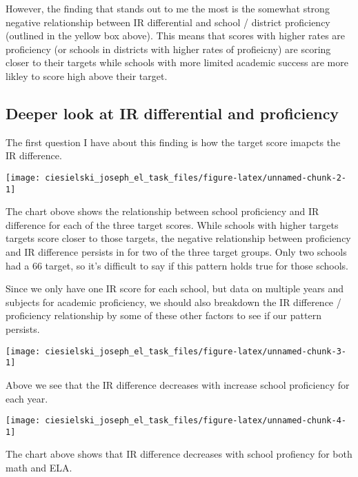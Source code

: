 \documentclass[]{article}
\begin{document}
However, the finding that stands out to me the most is the somewhat
strong negative relationship between IR differential and school /
district proficiency (outlined in the yellow box above). This means that
scores with higher rates are proficiency (or schools in districts with
higher rates of profieicny) are scoring closer to their targets while
schools with more limited academic success are more likley to score high
above their target.

\hypertarget{deeper-look-at-ir-differential-and-proficiency}{%
\subsection{Deeper look at IR differential and
proficiency}\label{deeper-look-at-ir-differential-and-proficiency}}

The first question I have about this finding is how the target score
imapcts the IR difference.

\begin{center}\texttt{[image: ciesielski\_joseph\_el\_task\_files/figure-latex/unnamed-chunk-2-1]} \end{center}

The chart obove shows the relationship between school proficiency and IR
difference for each of the three target scores. While schools with
higher targets targets score closer to those targets, the negative
relationship between proficiency and IR difference persists in for two
of the three target groups. Only two schools had a 66 target, so it's
difficult to say if this pattern holds true for those schools.

Since we only have one IR score for each school, but data on multiple
years and subjects for academic proficiency, we should also breakdown
the IR difference / proficiency relationship by some of these other
factors to see if our pattern persists.

\begin{center}\texttt{[image: ciesielski\_joseph\_el\_task\_files/figure-latex/unnamed-chunk-3-1]} \end{center}

Above we see that the IR difference decreases with increase school
proficiency for each year.

\begin{center}\texttt{[image: ciesielski\_joseph\_el\_task\_files/figure-latex/unnamed-chunk-4-1]} \end{center}

The chart above shows that IR difference decreases with school profiency
for both math and ELA.
\end{document}
